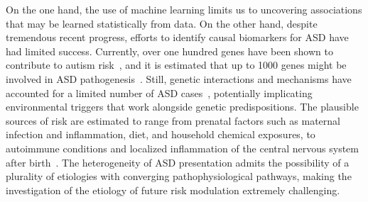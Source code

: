 \documentclass[onecolumn,,10pt]{IEEEtran}
\begin{document}
On the one hand, the use of machine learning limits us  to uncovering associations that may be learned statistically from data.
 On the other hand,  despite tremendous recent progress, efforts to  identify  causal biomarkers for ASD have had limited success. Currently,  over one hundred genes have been shown to contribute to autism risk~\cite{pmid26402605,pmid25038753,Satterstrom484113}, and it is  estimated that up to 1000 genes might be involved in ASD pathogenesis~\cite{pmid27891212}. Still, genetic interactions and mechanisms have accounted for a limited number of ASD cases~\cite{pmid18414403}, potentially implicating   environmental triggers that  work alongside genetic predispositions. The plausible sources of  risk are estimated to range from prenatal  factors such as maternal infection and inflammation, diet, and  household chemical exposures,  to autoimmune conditions and localized inflammation of the central nervous system after birth~\cite{pmid30971960,pmid30941018,pmid29691724,pmid29307081,pmid27351598,pmid26793298,pmid30095240,pmid25681541}. The heterogeneity of ASD presentation  admits the possibility of a plurality of   etiologies with converging pathophysiological pathways, making the investigation of the etiology of future risk modulation extremely challenging.
\end{document}
